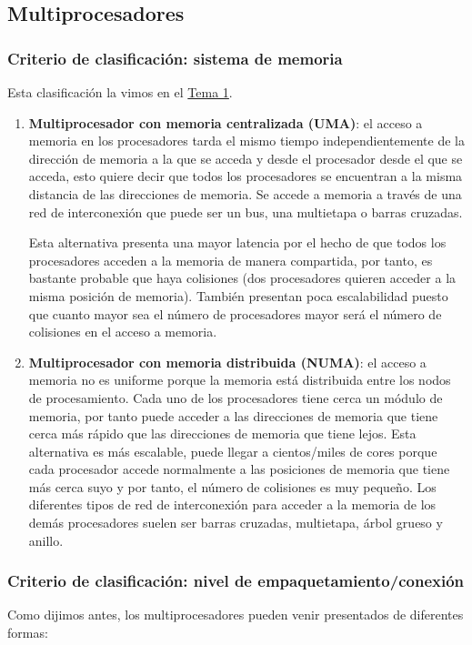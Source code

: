 \documentclass[10pt,a4paper,spanish]{report}
\begin{document}
\textcolor[rgb]{0.2,0.4,0.8}{\subsection{Multiprocesadores}}
\textcolor[rgb]{0.2,0.4,0.8}{\subsubsection{Criterio de clasificación: sistema de memoria}}
Esta clasificación la vimos en el \hyperref[clasif_memoria]{Tema 1}.
\begin{enumerate}[\color{azul}{\bf $\heartsuit$}]
    \item \textcolor[rgb]{0.2,0.4,0.8}{\textbf{Multiprocesador con memoria centralizada (UMA)}}: el acceso a memoria en los procesadores tarda el mismo tiempo independientemente de la dirección de memoria a la que se acceda y desde el procesador desde el que se acceda, esto quiere decir que todos los procesadores se encuentran a la misma distancia de las direcciones de memoria. Se accede a memoria a través de una red de interconexión que puede ser un bus, una multietapa o barras cruzadas.

    Esta alternativa presenta una mayor latencia por el hecho de que todos los procesadores acceden a la memoria de manera compartida, por tanto, es bastante probable que haya colisiones (dos procesadores quieren acceder a la misma posición de memoria). También presentan poca escalabilidad puesto que cuanto mayor sea el número de procesadores mayor será el número de colisiones en el acceso a memoria.

    \item \textcolor[rgb]{0.2,0.4,0.8}{\textbf{Multiprocesador con memoria distribuida (NUMA)}}: el acceso a memoria no es uniforme porque la memoria está distribuida entre los nodos de procesamiento. Cada uno de los procesadores tiene cerca un módulo de memoria, por tanto puede acceder a las direcciones de memoria que tiene cerca más rápido que las direcciones de memoria que tiene lejos. Esta alternativa es más escalable, puede llegar a cientos/miles de cores porque cada procesador accede normalmente a las posiciones de memoria que tiene más cerca suyo y por tanto, el número de colisiones es muy pequeño. Los diferentes tipos de red de interconexión para acceder a la memoria de los demás procesadores suelen ser barras cruzadas, multietapa, árbol grueso y anillo.
\end{enumerate}

\textcolor[rgb]{0.2,0.4,0.8}{\subsubsection{Criterio de clasificación: nivel de empaquetamiento/conexión}}
Como dijimos antes, los multiprocesadores pueden venir presentados de diferentes formas:
\end{document}
